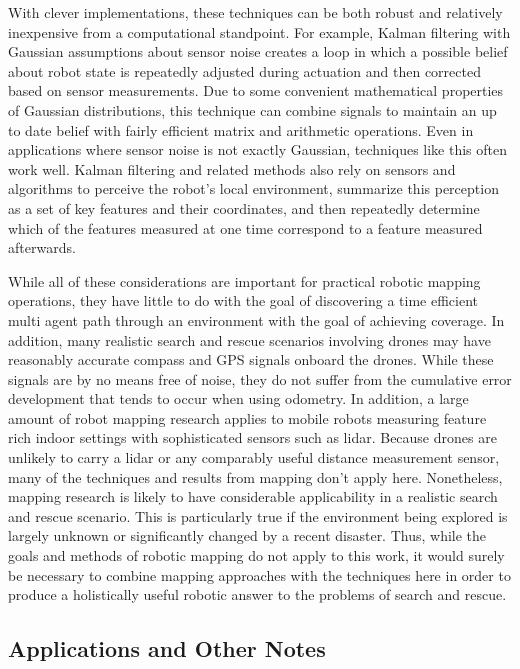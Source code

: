 With clever implementations, these techniques can be both robust and relatively inexpensive from a computational standpoint. For example, Kalman filtering with Gaussian assumptions about sensor noise creates a loop in which a possible belief about robot state is repeatedly adjusted during actuation and then corrected based on sensor measurements. Due to some convenient mathematical properties of Gaussian distributions, this technique can combine signals to maintain an up to date belief with fairly efficient matrix and arithmetic operations. Even in applications where sensor noise is not exactly Gaussian, techniques like this often work well. Kalman filtering and related methods also rely on sensors and algorithms to perceive the robot's local environment, summarize this perception as a set of key features and their coordinates, and then repeatedly determine which of the features measured at one time correspond to a feature measured afterwards.


While all of these considerations are important for practical robotic mapping operations, they have little to do with the goal of discovering a time efficient multi agent path through an environment with the goal of achieving coverage. In addition, many realistic search and rescue scenarios involving drones may have reasonably accurate compass and GPS signals onboard the drones. While these signals are by no means free of noise, they do not suffer from the cumulative error development that tends to occur when using odometry. In addition, a large amount of robot mapping research applies to mobile robots measuring feature rich indoor settings with sophisticated sensors such as lidar. Because drones are unlikely to carry a lidar or any comparably useful distance measurement sensor, many of the techniques and results from mapping don't apply here. Nonetheless, mapping research is likely to have considerable applicability in a realistic search and rescue scenario. This is particularly true if the environment being explored is largely unknown or significantly changed by a recent disaster. Thus, while the goals and methods of robotic mapping do not apply to this work, it would surely be necessary to combine mapping approaches with the techniques here in order to produce a holistically useful robotic answer to the problems of search and rescue.

\subsection{Applications and Other Notes}

